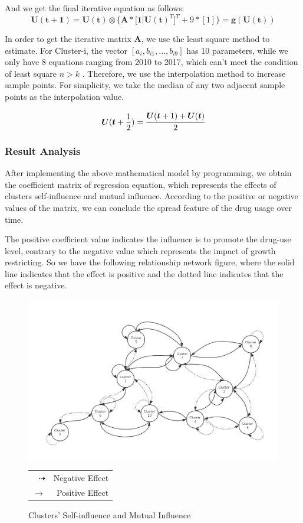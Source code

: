 \documentclass[12pt]{article}
\begin{document}
And we get the final iterative equation as follows:
\begin{equation}
	\bm{U(t+1) = U(t)} \otimes \{\bm{A * [1 | U(t)}^{T}]^{T} + 9 * [1]\} = \bm{g(U(t))}
\end{equation}

In order to get the iterative matrix $\bm{A}$, we use the least square method to estimate. For Cluster-i, the vector $[a_{i}, b_{i1}, ..., b_{i9}]$ has 10 parameters, while we only have 8 equations ranging from 2010 to 2017, which can’t meet the condition of least square $n > k$ . Therefore, we use the interpolation method to increase sample points. For simplicity, we take the median of any two adjacent sample points as the interpolation value.

\begin{equation}
	\bm{U}(\bm{t}+\frac{1}{2}) = \cfrac{\bm{U}(\bm{t}+1) + \bm{U}(\bm{t})}{2}
\end{equation}

\subsubsection{Result Analysis}
After implementing the above mathematical model by programming, we obtain the coefficient matrix of regression equation, which represents the effects of clusters self-influence and mutual influence. According to the positive or negative values of the matrix, we can conclude the spread feature of the drug usage over time. 

The positive coefficient value indicates the influence is to promote the drug-use level, contrary to the negative value which represents the impact of growth restricting. So we have the following relationship network figure, where the solid line indicates that the effect is positive and the dotted line indicates that the effect is negative.

\begin{figure}[H]
	\centering
	\includegraphics[scale=0.45]{./figures/15.png}
	\small
	\begin{tabular}{rr}
		$\dashrightarrow$ & Negative Effect \\
		$\longrightarrow$ & Positive Effect
	\end{tabular}
	\caption{Clusters' Self-influence and Mutual Influence}
	\label{Fig15}
\end{figure}
\end{document}
